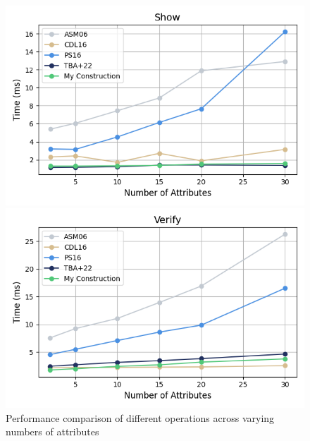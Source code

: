 \begin{figure}
    \begin{minipage}{0.48\textwidth}
        \centering
        \includegraphics[width=\textwidth]{figures/chap2_anoncreds_show.png}
    \end{minipage}
    \hfill
    \begin{minipage}{0.48\textwidth}
        \centering
        \includegraphics[width=\textwidth]{figures/chap2_anoncreds_verify.png}
    \end{minipage}
    
    \caption{Performance comparison of different operations across varying numbers of attributes}
    \label{fig:anoncreds-performance}
\end{figure}

